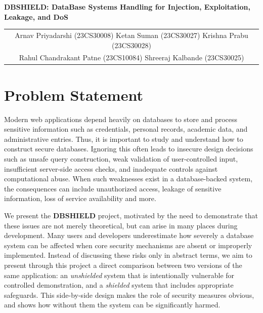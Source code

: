 \documentclass[11pt,a4paper]{article}
\title{}
\author{}
\date{}
\newcommand{\TitleFont}{\fontsize{15.5}{17.5}\selectfont}
\begin{document}
\begin{center}
{\TitleFont\bfseries
DBSHIELD: DataBase Systems Handling for Injection, Exploitation, Leakage, and DoS
\par}

\vspace{0.65em}

{\small
\begin{tabular}{c}
Arnav Priyadarshi (23CS30008) \quad
Ketan Suman (23CS30027) \quad
Krishna Prabu (23CS30028) \\[0.25em]
Rahul Chandrakant Patne (23CS10084) \quad
Shreeraj Kalbande (23CS30025) \\[0.35em]
\end{tabular}
\par}

\vspace{0.7em}
\end{center}

\section{Problem Statement}

Modern web applications depend heavily on databases to store and process sensitive information such as credentials, personal records, academic data, and administrative entries. Thus, it is important to study and understand how to construct secure databases. Ignoring this often leads to insecure design decisions such as unsafe query construction, weak validation of user-controlled input, insufficient server-side access checks, and inadequate controls against computational abuse. When such weaknesses exist in a database-backed system, the consequences can include unauthorized access, leakage of sensitive information, loss of service availability and more.

We present the \textbf{DBSHIELD} project, motivated by the need to demonstrate that these issues are not merely theoretical, but can arise in many places during development. Many users and developers underestimate how severely a database system can be affected when core security mechanisms are absent or improperly implemented. Instead of discussing these risks only in abstract terms, we aim to present through this project a direct comparison between two versions of the same application: an \textit{unshielded} system that is intentionally vulnerable for controlled demonstration, and a \textit{shielded} system that includes appropriate safeguards. This side-by-side design makes the role of security measures obvious, and shows how without them the system can be significantly harmed.
\end{document}
